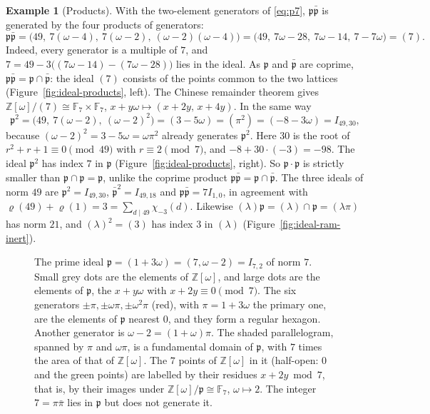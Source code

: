 \documentclass[11pt]{article}
\numberwithin{equation}{section}
\newcommand{\OO}{\mathbb Z[\omega]}
\newcommand{\F}{\mathbb F}
\newcommand{\ch}{\chi_{-3}}
\theoremstyle{definition}
\newtheorem{example}[theorem]{Example}
\theoremstyle{remark}
\begin{document}
\begin{example}[Products]\label{ex:products}
With the two-element generators of \eqref{eq:p7}, $\mathfrak p\bar{\mathfrak p}$ is generated by the four
products of generators:
\begin{equation}\label{eq:ppbar}
 \mathfrak p\bar{\mathfrak p}=\bigl(49,\ 7(\omega-4),\ 7(\omega-2),\ (\omega-2)(\omega-4)\bigr)
 =\bigl(49,\ 7\omega-28,\ 7\omega-14,\ 7-7\omega\bigr)=(7).
\end{equation}
Indeed, every generator is a multiple of $7$, and $7=49-3\bigl((7\omega-14)-(7\omega-28)\bigr)$ lies in the
ideal. As $\mathfrak p$ and $\bar{\mathfrak p}$ are coprime, $\mathfrak p\bar{\mathfrak p}=\mathfrak p\cap
\bar{\mathfrak p}$: the ideal $(7)$ consists of the points common to the two lattices
(Figure~\ref{fig:ideal-products}, left). The Chinese remainder theorem gives
$\OO/(7)\cong\F_7\times\F_7$, $x+y\omega\mapsto(x+2y,\,x+4y)$. In the same way
\begin{equation}\label{eq:psquare}
 \mathfrak p^2=\bigl(49,\ 7(\omega-2),\ (\omega-2)^2\bigr)=(3-5\omega)=(\pi^2)=(-8-3\omega)=I_{49,30},
\end{equation}
because $(\omega-2)^2=3-5\omega=\omega\pi^2$ already generates $\mathfrak p^2$. Here $30$ is the root of
$r^2+r+1\equiv0\pmod{49}$ with $r\equiv2\pmod7$, and $-8+30\cdot(-3)=-98$. The ideal $\mathfrak p^2$ has
index $7$ in $\mathfrak p$ (Figure~\ref{fig:ideal-products}, right). So $\mathfrak p\cdot\mathfrak p$ is strictly smaller
than $\mathfrak p\cap\mathfrak p=\mathfrak p$, unlike the coprime product $\mathfrak p\bar{\mathfrak p}=\mathfrak p\cap\bar{\mathfrak p}$.
The three ideals
of norm $49$ are $\mathfrak p^2=I_{49,30}$, $\bar{\mathfrak p}^2=I_{49,18}$ and $\mathfrak p\bar{\mathfrak p}=7I_{1,0}$,
in agreement with $\varrho(49)+\varrho(1)=3=\sum_{d\mid49}\ch(d)$. Likewise $(\lambda)\mathfrak p=(\lambda)\cap
\mathfrak p=(\lambda\pi)$ has norm $21$, and $(\lambda)^2=(3)$ has index $3$ in $(\lambda)$
(Figure~\ref{fig:ideal-ram-inert}).
\end{example}

\begin{figure}[ht]
\centering

\caption{The prime ideal $\mathfrak p=(1+3\omega)=(7,\omega-2)=I_{7,2}$ of norm $7$. Small grey dots are the
elements of $\OO$, and large dots are the elements of $\mathfrak p$, the $x+y\omega$ with $x+2y\equiv0\pmod 7$.
The six generators $\pm\pi,\pm\omega\pi,\pm\omega^2\pi$ (red), with $\pi=1+3\omega$ the primary one, are the
elements of $\mathfrak p$ nearest $0$, and they form a regular hexagon. Another generator is
$\omega-2=(1+\omega)\pi$. The shaded parallelogram, spanned by $\pi$ and $\omega\pi$, is a fundamental domain of
$\mathfrak p$, with $7$ times the area of that of $\OO$. The $7$ points of $\OO$ in it (half-open: $0$ and the
green points) are labelled
by their residues $x+2y\bmod7$, that is, by their images under $\OO/\mathfrak p\cong\F_7$, $\omega\mapsto2$. The
integer $7=\pi\bar\pi$ lies in $\mathfrak p$ but does not generate it.}
\label{fig:ideal-p7}
\end{figure}
\end{document}
